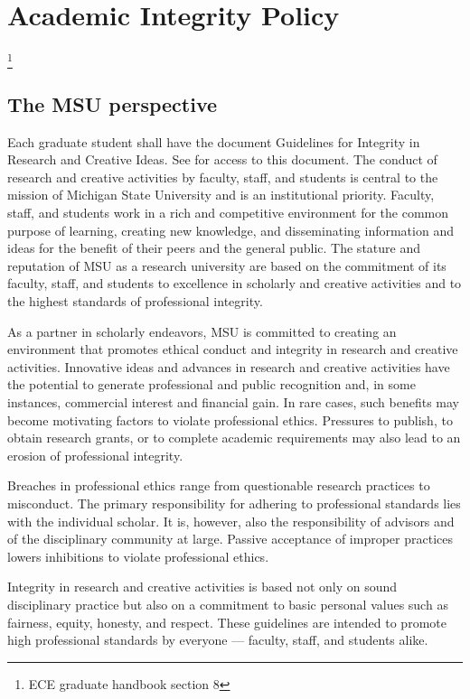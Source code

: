 \section{Academic Integrity Policy}\footnote{ECE graduate handbook section 8}

\subsection{The MSU perspective}

Each graduate student shall have the document Guidelines for Integrity
in Research and Creative Ideas. See  for access to
this document. The conduct of research and creative activities by
faculty, staff, and students is central to the mission of Michigan
State University and is an institutional priority. Faculty, staff, and
students work in a rich and competitive environment for the common
purpose of learning, creating new knowledge, and disseminating
information and ideas for the benefit of their peers and the general
public. The stature and reputation of MSU as a research university are
based on the commitment of its faculty, staff, and students to
excellence in scholarly and creative activities and to the highest
standards of professional integrity.  

As a partner in scholarly endeavors, MSU is committed to creating an
environment that promotes ethical conduct and integrity in research
and creative activities. Innovative ideas and advances in research and
creative activities have the potential to generate professional and
public recognition and, in some instances, commercial interest and
financial gain. In rare cases, such benefits may become motivating
factors to violate professional ethics. Pressures to publish, to
obtain research grants, or to complete academic requirements may also
lead to an erosion of professional integrity.  

Breaches in professional ethics range from questionable research
practices to misconduct. The primary responsibility for adhering to
professional standards lies with the individual scholar. It is,
however, also the responsibility of advisors and of the disciplinary
community at large. Passive acceptance of improper practices lowers
inhibitions to violate professional ethics. 

Integrity in research and creative activities is based not only on
sound disciplinary practice but also on a commitment to basic personal
values such as fairness, equity, honesty, and respect. These
guidelines are intended to promote high professional standards by
everyone — faculty, staff, and students alike.
  
